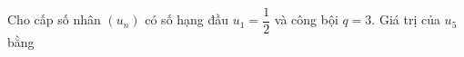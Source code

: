 \begin{ex}
Cho cấp số nhân $(u_n)$ có số hạng đầu $u_1=\dfrac12$ và công bội $q=3$. Giá trị của $u_5$ bằng
\end{ex}
